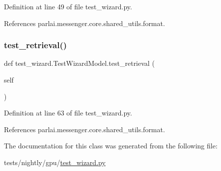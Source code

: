 Definition at line 49 of file test\+\_\+wizard.\+py.



References parlai.\+messenger.\+core.\+shared\+\_\+utils.\+format.

\mbox{\label{classtest__wizard_1_1TestWizardModel_a31b902bf6fff3ccfc8fe52228c2fc20f}} 
\subsubsection{\texorpdfstring{test\+\_\+retrieval()}{test\_retrieval()}}
{\footnotesize\ttfamily def test\+\_\+wizard.\+Test\+Wizard\+Model.\+test\+\_\+retrieval (\begin{DoxyParamCaption}\item[{}]{self }\end{DoxyParamCaption})}



Definition at line 63 of file test\+\_\+wizard.\+py.



References parlai.\+messenger.\+core.\+shared\+\_\+utils.\+format.



The documentation for this class was generated from the following file\+:\begin{DoxyCompactItemize}
\item 
tests/nightly/gpu/\hyperlink{test__wizard_8py}{test\+\_\+wizard.\+py}\end{DoxyCompactItemize}
